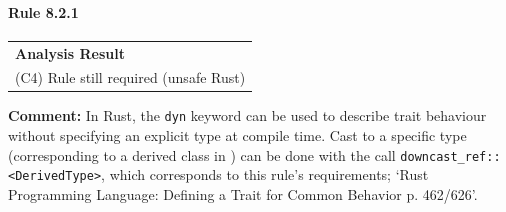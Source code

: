 \paragraph{Rule 8.2.1}
\begin{longtable}{p{13cm}}
\textbf{Analysis Result} \\
(C4) Rule still required (unsafe Rust) \\
\end{longtable}
\textbf{Comment:} In Rust, the \texttt{dyn} keyword can be used to describe trait behaviour without specifying an explicit type at compile time. Cast to a specific type (corresponding to a derived class in \Cpp) can be done with the call \texttt{downcast\_ref::\textless DerivedType\textgreater}, which corresponds to this rule's requirements; `Rust Programming Language: Defining a Trait for Common Behavior p. 462/626'. \\
